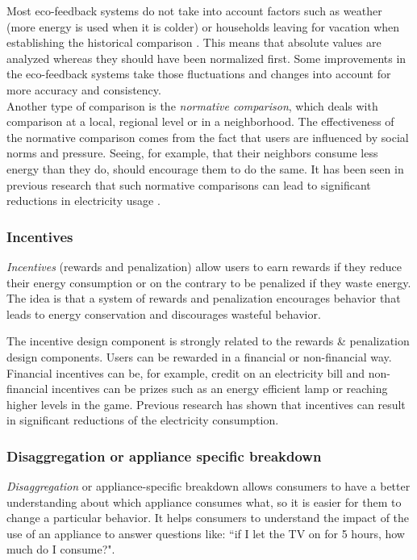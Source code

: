 \documentclass[journal]{vgtc}                %
\begin{document}
Most eco-feedback systems do not take into account factors such as weather (more energy is used when it is colder) or households leaving for vacation when establishing the historical comparison \cite{karjalainen2011consumer}. This means that absolute values are analyzed whereas they should have been normalized first. Some improvements in the eco-feedback systems take those fluctuations and changes into account for more accuracy and consistency. \\

Another type of comparison is the \textit{normative comparison}, which deals with comparison at a local, regional level or in a neighborhood. The effectiveness of the normative comparison comes from the fact that users are influenced by social norms and pressure. Seeing, for example, that their neighbors consume less energy than they do, should encourage them to do the same. It has been seen in previous research that such normative comparisons can lead to significant reductions in electricity usage \cite{peschiera2010response,siero1996changing,iyer2006comparison}.


\subsubsection{Incentives}
\textit{Incentives} (rewards and penalization) allow users to earn rewards if they reduce their energy consumption or on the contrary to be penalized if they waste energy. The idea is that a system of rewards and penalization encourages behavior that leads to energy conservation and discourages wasteful behavior.

The incentive design component is strongly related to the rewards \& penalization design components. Users can be rewarded in a financial or non-financial way. Financial incentives can be, for example, credit on an electricity bill and non-financial incentives can be prizes such as an energy efficient lamp or reaching higher levels in the game.
Previous research \cite{petersen2007dormitory} has shown that incentives can result in significant reductions of the electricity consumption.

\subsubsection{Disaggregation or appliance specific breakdown}
\textit{Disaggregation} or appliance-specific breakdown allows consumers to have a better understanding about which appliance consumes what, so it is easier for them to change a particular behavior. It helps consumers to understand the impact of the use of an appliance to answer questions like: ``if I let the TV on for 5 hours, how much do I consume?".
\end{document}
